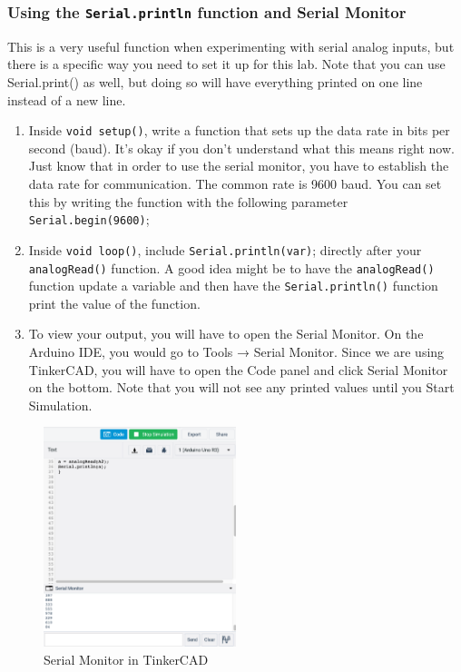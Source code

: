 \documentclass{article}
\begin{document}
\subsubsection{Using the \texttt{Serial.println} function and Serial Monitor}
This is a very useful function when experimenting with serial analog inputs, but there is a specific way you need to set it up for this lab. Note that you can use Serial.print() as well, but doing so will have everything printed on one line instead of a new line.
\begin{enumerate}
    \item Inside \texttt{void setup()}, write a function that sets up the data rate in bits per second (baud). It’s okay if you don’t understand what this means right now. Just know that in order to use the serial monitor, you have to establish the data rate for communication. The common rate is 9600 baud. You can set this by writing the function with the following parameter \texttt{Serial.begin(9600)};
    \item Inside \texttt{void loop()}, include \texttt{Serial.println(var)}; directly after your \texttt{analogRead()} function. A good idea might be to have the \texttt{analogRead()} function update a variable and then have the \texttt{Serial.println()} function print the value of the function.
    \item To view your output, you will have to open the Serial Monitor. On the Arduino IDE, you would go to Tools → Serial Monitor. Since we are using TinkerCAD, you will have to open the Code panel and click Serial Monitor on the bottom. Note that you will not see any printed values until you Start Simulation.
\end{enumerate}
    \begin{figure}[ht]
	\center
	\includegraphics[width=0.5\textwidth, keepaspectratio]{images/serialmonitor.png}
	\caption{Serial Monitor in TinkerCAD}
	\label{fig:serial}
\end{figure}
\end{document}
